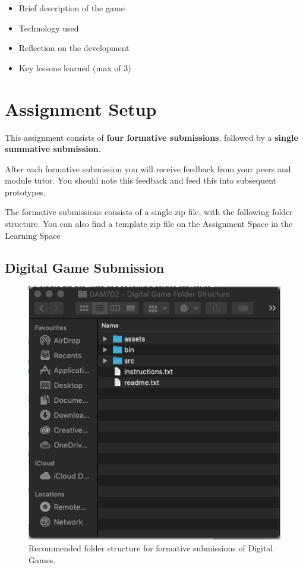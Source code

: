 \documentclass{../../fal_assignment}
\begin{document}
\begin{itemize}
	\item Brief description of the game
	\item Technology used
	\item Reflection on the development
	\item Key lessons learned (max of 3)
\end{itemize}

\section*{Assignment Setup} 

This assignment consists of \textbf{four formative submissions}, followed by a \textbf{single summative submission}.

After each formative submission you will receive feedback from your peers and module tutor. You should note this feedback and feed this into subsequent prototypes.  

The formative submissions consists of a single zip file, with the following folder structure. You can also find a template zip file on the Assignment Space in the Learning Space

\pagebreak
\subsection*{Digital Game Submission} 

\begin{figure}[H]
	\begin{center}
		\includegraphics[height=0.4\textheight]{digital_games_folder_structure}
	\end{center}
	\caption{Recommended folder structure for formative submissions of Digital Games.}
	\label{fig:digital_game_folder_structure}
\end{figure}
\end{document}
